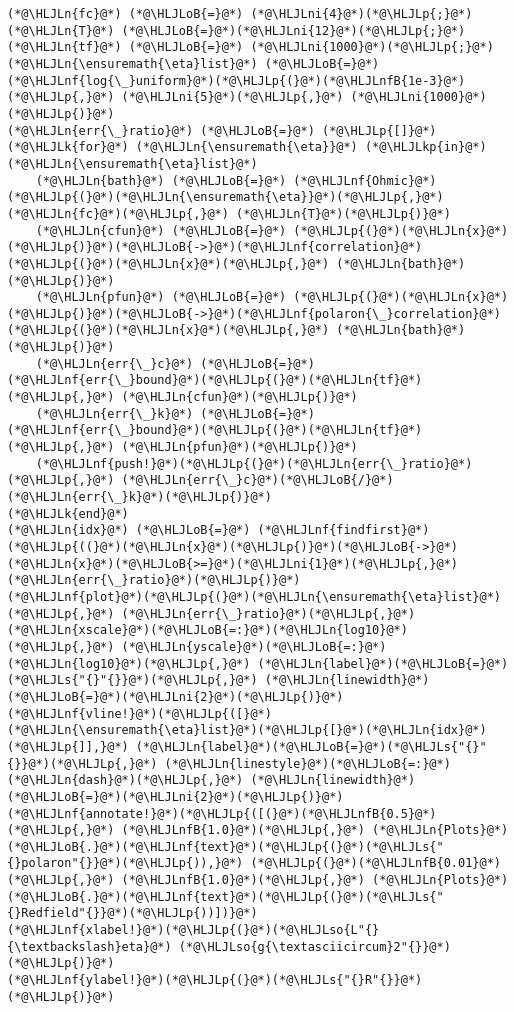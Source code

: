 \documentclass[12pt,a4paper]{article}
\newcommand{\HLJLk}[1]{\textcolor[RGB]{148,91,176}{\textbf{#1}}}
\newcommand{\HLJLkp}[1]{\textcolor[RGB]{148,91,176}{\textbf{#1}}}
\newcommand{\HLJLn}[1]{#1}
\newcommand{\HLJLnf}[1]{\textcolor[RGB]{66,102,213}{#1}}
\newcommand{\HLJLs}[1]{\textcolor[RGB]{201,61,57}{#1}}
\newcommand{\HLJLso}[1]{\textcolor[RGB]{201,61,57}{#1}}
\newcommand{\HLJLnfB}[1]{\textcolor[RGB]{59,151,46}{#1}}
\newcommand{\HLJLni}[1]{\textcolor[RGB]{59,151,46}{#1}}
\newcommand{\HLJLoB}[1]{\textcolor[RGB]{102,102,102}{\textbf{#1}}}
\newcommand{\HLJLp}[1]{#1}
\begin{document}
\begin{lstlisting}
(*@\HLJLn{fc}@*) (*@\HLJLoB{=}@*) (*@\HLJLni{4}@*)(*@\HLJLp{;}@*) (*@\HLJLn{T}@*) (*@\HLJLoB{=}@*)(*@\HLJLni{12}@*)(*@\HLJLp{;}@*) (*@\HLJLn{tf}@*) (*@\HLJLoB{=}@*) (*@\HLJLni{1000}@*)(*@\HLJLp{;}@*)
(*@\HLJLn{\ensuremath{\eta}list}@*) (*@\HLJLoB{=}@*) (*@\HLJLnf{log{\_}uniform}@*)(*@\HLJLp{(}@*)(*@\HLJLnfB{1e-3}@*)(*@\HLJLp{,}@*) (*@\HLJLni{5}@*)(*@\HLJLp{,}@*) (*@\HLJLni{1000}@*)(*@\HLJLp{)}@*)
(*@\HLJLn{err{\_}ratio}@*) (*@\HLJLoB{=}@*) (*@\HLJLp{[]}@*)
(*@\HLJLk{for}@*) (*@\HLJLn{\ensuremath{\eta}}@*) (*@\HLJLkp{in}@*) (*@\HLJLn{\ensuremath{\eta}list}@*)
    (*@\HLJLn{bath}@*) (*@\HLJLoB{=}@*) (*@\HLJLnf{Ohmic}@*)(*@\HLJLp{(}@*)(*@\HLJLn{\ensuremath{\eta}}@*)(*@\HLJLp{,}@*) (*@\HLJLn{fc}@*)(*@\HLJLp{,}@*) (*@\HLJLn{T}@*)(*@\HLJLp{)}@*)
    (*@\HLJLn{cfun}@*) (*@\HLJLoB{=}@*) (*@\HLJLp{(}@*)(*@\HLJLn{x}@*)(*@\HLJLp{)}@*)(*@\HLJLoB{->}@*)(*@\HLJLnf{correlation}@*)(*@\HLJLp{(}@*)(*@\HLJLn{x}@*)(*@\HLJLp{,}@*) (*@\HLJLn{bath}@*)(*@\HLJLp{)}@*)
    (*@\HLJLn{pfun}@*) (*@\HLJLoB{=}@*) (*@\HLJLp{(}@*)(*@\HLJLn{x}@*)(*@\HLJLp{)}@*)(*@\HLJLoB{->}@*)(*@\HLJLnf{polaron{\_}correlation}@*)(*@\HLJLp{(}@*)(*@\HLJLn{x}@*)(*@\HLJLp{,}@*) (*@\HLJLn{bath}@*)(*@\HLJLp{)}@*)
    (*@\HLJLn{err{\_}c}@*) (*@\HLJLoB{=}@*) (*@\HLJLnf{err{\_}bound}@*)(*@\HLJLp{(}@*)(*@\HLJLn{tf}@*)(*@\HLJLp{,}@*) (*@\HLJLn{cfun}@*)(*@\HLJLp{)}@*)
    (*@\HLJLn{err{\_}k}@*) (*@\HLJLoB{=}@*) (*@\HLJLnf{err{\_}bound}@*)(*@\HLJLp{(}@*)(*@\HLJLn{tf}@*)(*@\HLJLp{,}@*) (*@\HLJLn{pfun}@*)(*@\HLJLp{)}@*)
    (*@\HLJLnf{push!}@*)(*@\HLJLp{(}@*)(*@\HLJLn{err{\_}ratio}@*)(*@\HLJLp{,}@*) (*@\HLJLn{err{\_}c}@*)(*@\HLJLoB{/}@*)(*@\HLJLn{err{\_}k}@*)(*@\HLJLp{)}@*)
(*@\HLJLk{end}@*)
(*@\HLJLn{idx}@*) (*@\HLJLoB{=}@*) (*@\HLJLnf{findfirst}@*)(*@\HLJLp{((}@*)(*@\HLJLn{x}@*)(*@\HLJLp{)}@*)(*@\HLJLoB{->}@*)(*@\HLJLn{x}@*)(*@\HLJLoB{>=}@*)(*@\HLJLni{1}@*)(*@\HLJLp{,}@*) (*@\HLJLn{err{\_}ratio}@*)(*@\HLJLp{)}@*)
(*@\HLJLnf{plot}@*)(*@\HLJLp{(}@*)(*@\HLJLn{\ensuremath{\eta}list}@*)(*@\HLJLp{,}@*) (*@\HLJLn{err{\_}ratio}@*)(*@\HLJLp{,}@*) (*@\HLJLn{xscale}@*)(*@\HLJLoB{=:}@*)(*@\HLJLn{log10}@*)(*@\HLJLp{,}@*) (*@\HLJLn{yscale}@*)(*@\HLJLoB{=:}@*)(*@\HLJLn{log10}@*)(*@\HLJLp{,}@*) (*@\HLJLn{label}@*)(*@\HLJLoB{=}@*)(*@\HLJLs{"{}"{}}@*)(*@\HLJLp{,}@*) (*@\HLJLn{linewidth}@*)(*@\HLJLoB{=}@*)(*@\HLJLni{2}@*)(*@\HLJLp{)}@*)
(*@\HLJLnf{vline!}@*)(*@\HLJLp{([}@*)(*@\HLJLn{\ensuremath{\eta}list}@*)(*@\HLJLp{[}@*)(*@\HLJLn{idx}@*)(*@\HLJLp{]],}@*) (*@\HLJLn{label}@*)(*@\HLJLoB{=}@*)(*@\HLJLs{"{}"{}}@*)(*@\HLJLp{,}@*) (*@\HLJLn{linestyle}@*)(*@\HLJLoB{=:}@*)(*@\HLJLn{dash}@*)(*@\HLJLp{,}@*) (*@\HLJLn{linewidth}@*)(*@\HLJLoB{=}@*)(*@\HLJLni{2}@*)(*@\HLJLp{)}@*)
(*@\HLJLnf{annotate!}@*)(*@\HLJLp{([(}@*)(*@\HLJLnfB{0.5}@*)(*@\HLJLp{,}@*) (*@\HLJLnfB{1.0}@*)(*@\HLJLp{,}@*) (*@\HLJLn{Plots}@*)(*@\HLJLoB{.}@*)(*@\HLJLnf{text}@*)(*@\HLJLp{(}@*)(*@\HLJLs{"{}polaron"{}}@*)(*@\HLJLp{)),}@*) (*@\HLJLp{(}@*)(*@\HLJLnfB{0.01}@*)(*@\HLJLp{,}@*) (*@\HLJLnfB{1.0}@*)(*@\HLJLp{,}@*) (*@\HLJLn{Plots}@*)(*@\HLJLoB{.}@*)(*@\HLJLnf{text}@*)(*@\HLJLp{(}@*)(*@\HLJLs{"{}Redfield"{}}@*)(*@\HLJLp{))])}@*)
(*@\HLJLnf{xlabel!}@*)(*@\HLJLp{(}@*)(*@\HLJLso{L"{}{\textbackslash}eta}@*) (*@\HLJLso{g{\textasciicircum}2"{}}@*)(*@\HLJLp{)}@*)
(*@\HLJLnf{ylabel!}@*)(*@\HLJLp{(}@*)(*@\HLJLs{"{}R"{}}@*)(*@\HLJLp{)}@*)
\end{lstlisting}
\end{document}
